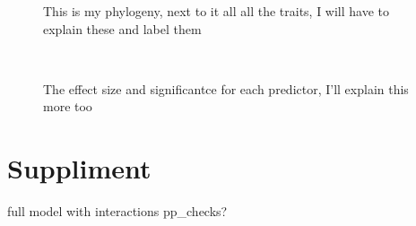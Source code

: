 \documentclass{article}\usepackage[]{graphicx}\usepackage[]{color}
\begin{document}
\begin{figure}[H]
  \caption{This is my phylogeny, next to it all all the traits, I will have to explain these and label them}
  \label{Tree}
\end{figure}\\
\begin{figure}[H]
  \caption{The effect size and significantce for each predictor, I'll explain this more too}
  \label{Effect sizes}
\end{figure}

\section{Suppliment}
full model with interactions
pp_checks?
\end{document}
